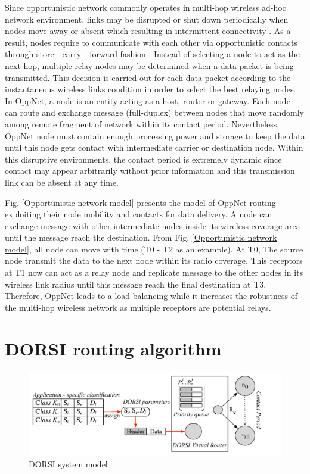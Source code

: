 Since opportunistic network commonly operates in multi-hop wireless ad-hoc network environment, links may be disrupted or shut down periodically when nodes move away or absent which resulting in intermittent connectivity \cite{Moreira2011}. As a result, nodes require to communicate with each other via opportunistic contacts through store - carry - forward fashion \cite{Chung-Ming2008}. Instead of selecting a node to act as the next hop, multiple relay nodes may be determined when a data packet is being transmitted. This decision is carried out for each data packet according to the instantaneous wireless links condition in order to select the best relaying nodes. In OppNet, a node is an entity acting as a host, router or gateway. Each node can route and exchange message (full-duplex) between nodes that move randomly among remote fragment of network within its contact period. Nevertheless, OppNet node must contain enough processing power and storage to keep the data until this node gets contact with intermediate carrier or destination node. Within this disruptive environments, the contact period is extremely dynamic since contact may appear arbitrarily without prior information and this transmission link can be absent at any time.

Fig. \ref{Opportunistic network model} presents the model of OppNet routing exploiting their node mobility and contacts for data delivery. A node can exchange message with other intermediate nodes inside its wireless coverage area until the message reach the destination. From Fig. \ref{Opportunistic network model}, all node can move with time (T0 - T2 as an example). At T0, The source node transmit the data to the next node within its radio coverage. This receptors at T1 now can act as a relay node and replicate message to the other nodes in its wireless link radius until this message reach the final destination at T3. Therefore, OppNet leads to a load balancing while it increases the robustness of the multi-hop wireless network as multiple receptors are potential relays.


\section{DORSI routing algorithm}
\label{DORSI:DORSI routing algorithm}
\begin{figure}[!t]
\centering
\includegraphics[width=5.5in]{Figures/DORSIsystemModel.pdf}
\caption{DORSI system model}
\label{DORSI system model}
\end{figure}

